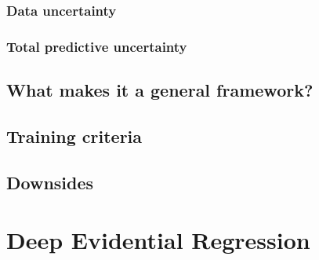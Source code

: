    \subsubsection{Data uncertainty}
    
    \subsubsection{Total predictive uncertainty}
    
    \subsection{What makes it a general framework?}
    
    \subsection{Training criteria}
    
    \subsection{Downsides}
    
    
    \section{Deep Evidential Regression}\label{der}

